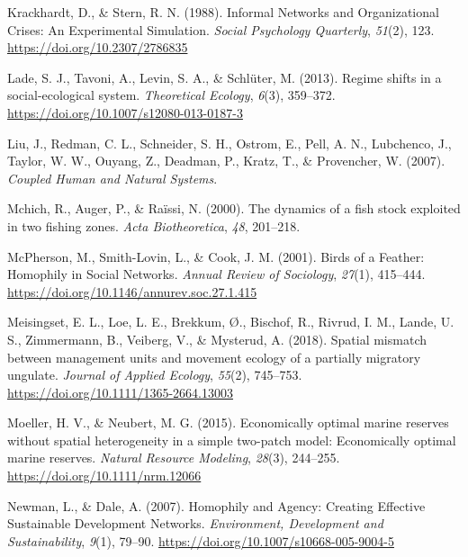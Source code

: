 \documentclass[
  12pt,
]{article}
\newlength{\cslhangindent}
\newlength{\cslentryspacingunit} %
\newenvironment{CSLReferences}[2] %
 {%
  \setlength{\parindent}{0pt}
  \ifodd #1
  \let\oldpar\par
  \def\par{\hangindent=\cslhangindent\oldpar}
  \fi
  \setlength{\parskip}{#2\cslentryspacingunit}
 }%
 {}
\begin{document}
\begin{CSLReferences}{1}{2}
\leavevmode{}%
Krackhardt, D., \& Stern, R. N. (1988). Informal {Networks} and {Organizational Crises}: {An Experimental Simulation}. \emph{Social Psychology Quarterly}, \emph{51}(2), 123. \url{https://doi.org/10.2307/2786835}

\leavevmode{}%
Lade, S. J., Tavoni, A., Levin, S. A., \& Schlüter, M. (2013). Regime shifts in a social-ecological system. \emph{Theoretical Ecology}, \emph{6}(3), 359--372. \url{https://doi.org/10.1007/s12080-013-0187-3}

\leavevmode{}%
Liu, J., Redman, C. L., Schneider, S. H., Ostrom, E., Pell, A. N., Lubchenco, J., Taylor, W. W., Ouyang, Z., Deadman, P., Kratz, T., \& Provencher, W. (2007). \emph{Coupled {Human} and {Natural Systems}}.

\leavevmode{}%
Mchich, R., Auger, P., \& Raïssi, N. (2000). The dynamics of a fish stock exploited in two fishing zones. \emph{Acta Biotheoretica}, \emph{48}, 201--218.

\leavevmode{}%
McPherson, M., Smith-Lovin, L., \& Cook, J. M. (2001). Birds of a {Feather}: {Homophily} in {Social Networks}. \emph{Annual Review of Sociology}, \emph{27}(1), 415--444. \url{https://doi.org/10.1146/annurev.soc.27.1.415}

\leavevmode{}%
Meisingset, E. L., Loe, L. E., Brekkum, Ø., Bischof, R., Rivrud, I. M., Lande, U. S., Zimmermann, B., Veiberg, V., \& Mysterud, A. (2018). Spatial mismatch between management units and movement ecology of a partially migratory ungulate. \emph{Journal of Applied Ecology}, \emph{55}(2), 745--753. \url{https://doi.org/10.1111/1365-2664.13003}

\leavevmode{}%
Moeller, H. V., \& Neubert, M. G. (2015). Economically optimal marine reserves without spatial heterogeneity in a simple two-patch model: {Economically} optimal marine reserves. \emph{Natural Resource Modeling}, \emph{28}(3), 244--255. \url{https://doi.org/10.1111/nrm.12066}

\leavevmode{}%
Newman, L., \& Dale, A. (2007). Homophily and {Agency}: {Creating Effective Sustainable Development Networks}. \emph{Environment, Development and Sustainability}, \emph{9}(1), 79--90. \url{https://doi.org/10.1007/s10668-005-9004-5}


\end{CSLReferences}
\end{document}
